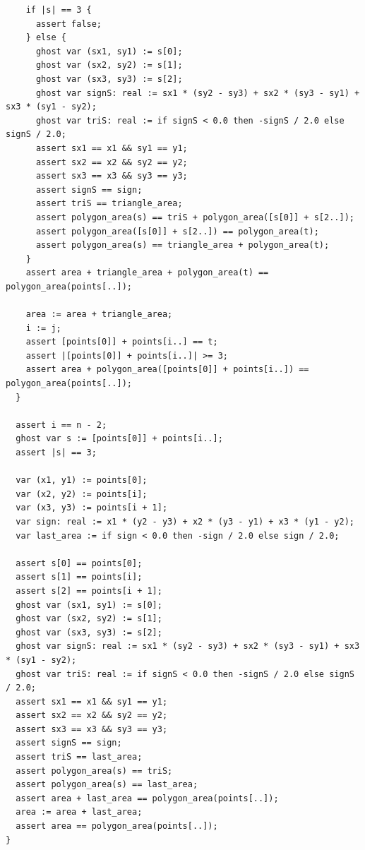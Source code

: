 \documentclass{article}
\begin{document}
\begin{lstlisting}
    if |s| == 3 {
      assert false;
    } else {
      ghost var (sx1, sy1) := s[0];
      ghost var (sx2, sy2) := s[1];
      ghost var (sx3, sy3) := s[2];
      ghost var signS: real := sx1 * (sy2 - sy3) + sx2 * (sy3 - sy1) + sx3 * (sy1 - sy2);
      ghost var triS: real := if signS < 0.0 then -signS / 2.0 else signS / 2.0;
      assert sx1 == x1 && sy1 == y1;
      assert sx2 == x2 && sy2 == y2;
      assert sx3 == x3 && sy3 == y3;
      assert signS == sign;
      assert triS == triangle_area;
      assert polygon_area(s) == triS + polygon_area([s[0]] + s[2..]);
      assert polygon_area([s[0]] + s[2..]) == polygon_area(t);
      assert polygon_area(s) == triangle_area + polygon_area(t);
    }
    assert area + triangle_area + polygon_area(t) == polygon_area(points[..]);

    area := area + triangle_area;
    i := j;
    assert [points[0]] + points[i..] == t;
    assert |[points[0]] + points[i..]| >= 3;
    assert area + polygon_area([points[0]] + points[i..]) == polygon_area(points[..]);
  }

  assert i == n - 2;
  ghost var s := [points[0]] + points[i..];
  assert |s| == 3;

  var (x1, y1) := points[0];
  var (x2, y2) := points[i];
  var (x3, y3) := points[i + 1];
  var sign: real := x1 * (y2 - y3) + x2 * (y3 - y1) + x3 * (y1 - y2);
  var last_area := if sign < 0.0 then -sign / 2.0 else sign / 2.0;

  assert s[0] == points[0];
  assert s[1] == points[i];
  assert s[2] == points[i + 1];
  ghost var (sx1, sy1) := s[0];
  ghost var (sx2, sy2) := s[1];
  ghost var (sx3, sy3) := s[2];
  ghost var signS: real := sx1 * (sy2 - sy3) + sx2 * (sy3 - sy1) + sx3 * (sy1 - sy2);
  ghost var triS: real := if signS < 0.0 then -signS / 2.0 else signS / 2.0;
  assert sx1 == x1 && sy1 == y1;
  assert sx2 == x2 && sy2 == y2;
  assert sx3 == x3 && sy3 == y3;
  assert signS == sign;
  assert triS == last_area;
  assert polygon_area(s) == triS;
  assert polygon_area(s) == last_area;
  assert area + last_area == polygon_area(points[..]);
  area := area + last_area;
  assert area == polygon_area(points[..]);
}
\end{lstlisting}
\end{document}
